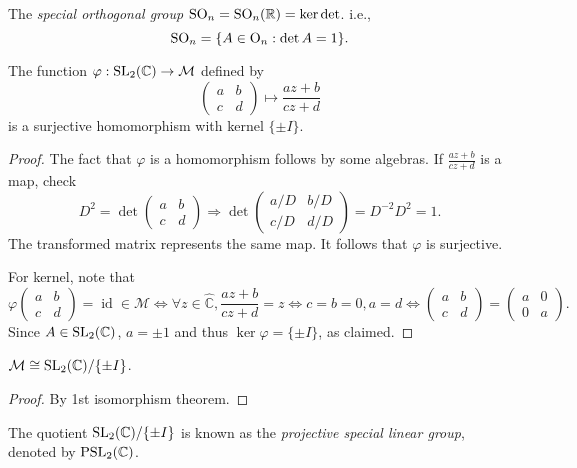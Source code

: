 \documentclass[a4paper]{article}
\begin{document}
    \begin{definition}
        The \textit{special orthogonal group} $ \mathrm{SO}_n=\mathrm{SO}_n(\mathbb{R}) = \ker \det $. i.e.,
        \[
            \mathrm{SO}_n=\{A\in \mathrm{O}_n:\det A=1\}.
        \]
    \end{definition}
    \begin{proposition}\label{prop:7.6}
        The function $ \varphi:\mathrm{SL}_2(\mathbb{C})\to \mathcal{M} $ defined by 
        \[
            \begin{pmatrix}
                a&b\\
                c&d
            \end{pmatrix} \mapsto \frac{az+b}{cz+d}
        \]
        is a surjective homomorphism with kernel $ \{\pm I\} $.
    \end{proposition}
    \begin{proof}
        The fact that $ \varphi $ is a homomorphism follows by some algebras. If $ \frac{az+b}{cz+d} $ is a \mobius map, check
        \[
            D^2=\det \begin{pmatrix}
                a&b\\
                c&d
            \end{pmatrix} \Longrightarrow \det \begin{pmatrix}
                a/D&b/D\\
                c/D&d/D
            \end{pmatrix}=D^{-2}D^2=1.
        \]
        The transformed matrix represents the same \mobius map. It follows that $ \varphi $ is surjective.

        For kernel, note that 
        \[
            \varphi\begin{pmatrix}
                a&b\\
                c&d
            \end{pmatrix}=\operatorname{id}\in \mathcal{M} \Longleftrightarrow \forall z\in \hat{\mathbb{C}},\frac{az+b}{cz+d}=z \Longleftrightarrow c=b=0,a=d \Longleftrightarrow \begin{pmatrix}
                a&b\\
                c&d
            \end{pmatrix}=\begin{pmatrix}
                a&0\\
                0&a
            \end{pmatrix}.
        \]
        Since $ A\in \mathrm{SL}_2(\mathbb{C}) $, $a=\pm 1$ and thus $ \ker \varphi=\{\pm I\} $, as claimed. 
    \end{proof}
    \begin{corollary}\label{col:7.7}
            $ \mathcal{M} \cong \mathrm{SL}_2(\mathbb{C})/\{\pm I\} $.
    \end{corollary}
    \begin{proof}
        By 1st isomorphism theorem.
    \end{proof}
    \begin{remark}
        The quotient $\mathrm{SL}_2(\mathbb{C})/\{\pm I\}$ is known as the \textit{projective special linear group}, denoted by $ \mathrm{PSL}_2(\mathbb{C}) $.
    \end{remark}
\end{document}
